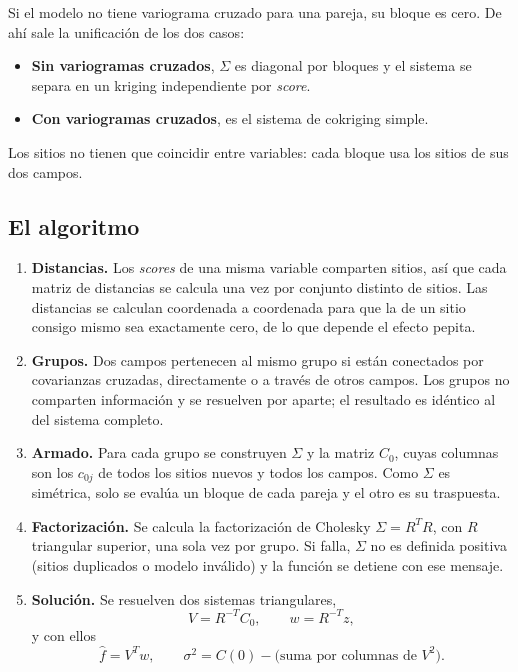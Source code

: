 \documentclass[11pt,a4paper]{article}
\begin{document}
Si el modelo no tiene variograma cruzado para una pareja, su bloque es cero.
De ahí sale la unificación de los dos casos:
\begin{itemize}
  \item \textbf{Sin variogramas cruzados}, $\Sigma$ es diagonal por bloques y
        el sistema se separa en un kriging independiente por \emph{score}.
  \item \textbf{Con variogramas cruzados}, es el sistema de cokriging simple.
\end{itemize}
Los sitios no tienen que coincidir entre variables: cada bloque usa los
sitios de sus dos campos.

\subsection{El algoritmo}

\begin{enumerate}
  \item \textbf{Distancias.} Los \emph{scores} de una misma variable comparten
        sitios, así que cada matriz de distancias se calcula una vez por
        conjunto distinto de sitios. Las distancias se calculan coordenada a
        coordenada para que la de un sitio consigo mismo sea exactamente
        cero, de lo que depende el efecto pepita.
  \item \textbf{Grupos.} Dos campos pertenecen al mismo grupo si están
        conectados por covarianzas cruzadas, directamente o a través de otros
        campos. Los grupos no comparten información y se resuelven por
        aparte; el resultado es idéntico al del sistema completo.
  \item \textbf{Armado.} Para cada grupo se construyen $\Sigma$ y la matriz
        $C_0$, cuyas columnas son los $c_{0j}$ de todos los sitios nuevos y
        todos los campos. Como $\Sigma$ es simétrica, solo se evalúa un bloque
        de cada pareja y el otro es su traspuesta.
  \item \textbf{Factorización.} Se calcula la factorización de Cholesky
        $\Sigma = R^{T} R$, con $R$ triangular superior, una sola vez por
        grupo. Si falla, $\Sigma$ no es definida positiva (sitios duplicados o
        modelo inválido) y la función se detiene con ese mensaje.
  \item \textbf{Solución.} Se resuelven dos sistemas triangulares,
        \[
          V = R^{-T} C_0, \qquad w = R^{-T} z,
        \]
        y con ellos
        \begin{equation}
          \hat f = V^{T} w,
          \qquad
          \sigma^2 = C(0) - \text{(suma por columnas de } V^2\text{)}.
          \label{eq:triangular}
        \end{equation}
\end{enumerate}
\end{document}

